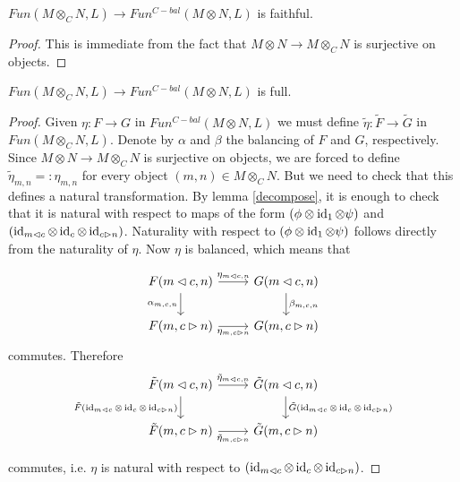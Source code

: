 \begin{lemma}\label{faithful}
  $Fun(M\otimes_C N,L)\to Fun^{C-bal}(M\otimes N,L)$ is faithful.
\end{lemma}

\begin{proof}
  This is immediate from the fact that $M\otimes N \to M\otimes_C N$ is
  surjective on objects.
\end{proof}

\begin{lemma}\label{full}
  $Fun(M\otimes_C N,L)\to Fun^{C-bal}(M\otimes N,L)$ is full.
\end{lemma}

\begin{proof}
  Given $\eta:F\to G$ in $Fun^{C-bal}(M\otimes N,L)$ we must define
  $\tilde{\eta}:\tilde{F}\to\tilde{G}$ in $Fun(M\otimes_C N,L)$. Denote by
  $\alpha$ and $\beta$ the balancing of $F$ and $G$, respectively. Since
  $M\otimes N\to M\otimes_C N$ is surjective on objects, we are forced to
  define $\tilde{\eta}_{m,n}=:\eta_{m,n}$ for every object $(m,n)\in
  M\otimes_C N$. But we need to check that this defines a natural
  transformation. By lemma \ref{decompose}, it is enough to check that it is
  natural with respect to maps of the form $(\phi\otimes\operatorname{id}_1\otimes\psi)$ and
  $(\operatorname{id}_{m\lhd c}\otimes\operatorname{id}_c\otimes\operatorname{id}_{c\rhd n})$. Naturality with respect
  to $(\phi\otimes\operatorname{id}_1\otimes\psi)$ follows directly from the naturality of
  $\eta$. Now $\eta$ is balanced, which means that

  \[
    \begin{tikzcd}
      {F(m\lhd c, n)} & {G(m\lhd c, n)} \\
      {F(m,c\rhd n)} & {G(m,c\rhd n)}
      \arrow["{\eta_{m\lhd c, n}}", from=1-1, to=1-2]
      \arrow["{\alpha_{m,c,n}}"', from=1-1, to=2-1]
      \arrow["{\beta_{m,c,n}}", from=1-2, to=2-2]
      \arrow["{\eta_{m,c\rhd n}}"', from=2-1, to=2-2]
    \end{tikzcd}\]
  commutes. Therefore
  \[
    \begin{tikzcd}
      {\tilde{F}(m\lhd c, n)} & {\tilde{G}(m\lhd c, n)} \\
      {\tilde{F}(m,c\rhd n)} & {\tilde{G}(m,c\rhd n)}
      \arrow["{\tilde{\eta}_{m\lhd c, n}}", from=1-1, to=1-2]
      \arrow["{\tilde{F}(\id_{m\lhd c}\otimes\id_c\otimes\id_{c\rhd n})}"', from=1-1, to=2-1]
      \arrow["{\tilde{G}(\id_{m\lhd c}\otimes\id_c\otimes\id_{c\rhd n})}", from=1-2, to=2-2]
      \arrow["{\tilde{\eta}_{m,c\rhd n}}"', from=2-1, to=2-2]
    \end{tikzcd}
  \]

  \noindent commutes, i.e. $\eta$ is natural with respect to $(\operatorname{id}_{m\lhd
  c}\otimes\operatorname{id}_c\otimes\operatorname{id}_{c\rhd n})$.
\end{proof}

